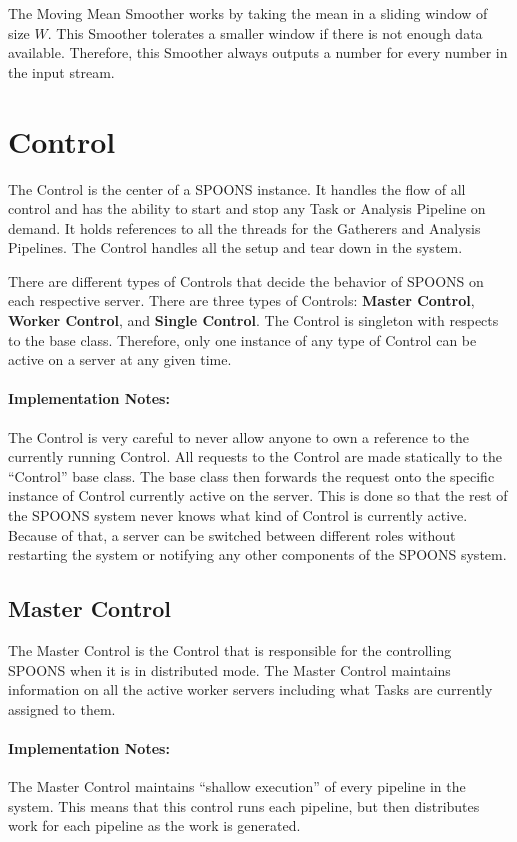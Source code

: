 \documentclass[12pt]{ucthesis}
\begin{document}
The Moving Mean Smoother works by taking the mean in a sliding window of size $W$.
This Smoother tolerates a smaller window if there is not enough data available.
Therefore, this Smoother always outputs a number for every number in the input stream.

\section{Control}
\label{arch-control}
The Control is the center of a SPOONS instance. It handles the flow of all control and has the ability to start and
stop any Task or Analysis Pipeline on demand. It holds references to all the threads for the Gatherers and Analysis Pipelines.
The Control handles all the setup and tear down in the system.

There are different types of Controls that decide the behavior of SPOONS on each respective server.
There are three types of Controls: \textbf{Master Control}, \textbf{Worker Control}, and \textbf{Single Control}.
The Control is singleton with respects to the base class.
Therefore, only one instance of any type of Control can be active on a server at any given time.

\paragraph{Implementation Notes:}
The Control is very careful to never allow anyone to own a reference to the currently running Control.
All requests to the Control are made statically to the ``Control'' base class.
The base class then forwards the request onto the specific instance of Control currently active on the server.
This is done so that the rest of the SPOONS system never knows what kind of Control is currently active.
Because of that, a server can be switched between different roles without restarting the system or notifying any other components of the SPOONS system.

\subsection{Master Control}
\label{arch-master-control}
The Master Control is the Control that is responsible for the controlling SPOONS when it is in distributed mode.
The Master Control maintains information on all the active worker servers including what Tasks are currently assigned to them.

\paragraph{Implementation Notes:}
The Master Control maintains ``shallow execution'' of every pipeline in the system.
This means that this control runs each pipeline, but then distributes work for each pipeline as the work is generated.
\end{document}

